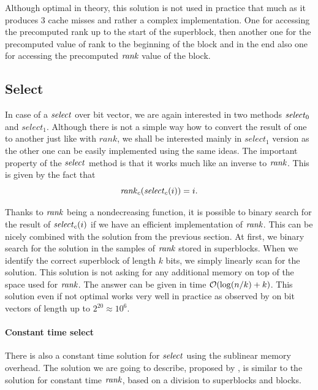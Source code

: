 Although optimal in theory, this solution is not used in practice that much as it produces
3 cache misses and rather a complex implementation. One for accessing the precomputed rank up
to the start of the superblock, then another one for the precomputed value of rank to the
beginning of the block and in the end also one for accessing the precomputed $\mathit{rank}$ value
of the block.


\subsection{Select}
\label{section:select}

In case of a $\mathit{select}$ over bit vector, we are again interested in two methods $\mathit{select}_0$
and $select_1$. Although there is not a simple way how to convert the result of one to
another just like with $rank$, we shall be interested mainly in $select_1$ version as the
other one can be easily implemented using the same ideas. The important property of the
$\mathit{select}$ method is that it works much like an inverse to $\mathit{rank}$. This is given by the fact that
$$\mathit{rank}_c(\mathit{select}_c(i)) = i.$$

Thanks to $\mathit{rank}$ being a nondecreasing function, it is possible
to binary search for the result of $\mathit{select}_c(i)$ if we have an efficient implementation of
$\mathit{rank}$. This can be nicely combined with the solution from the previous section.
At first, we binary search for the solution in the samples of $\mathit{rank}$ stored in superblocks. When we
identify the correct superblock of length $k$ bits, we simply linearly scan for the solution. This
solution is not asking for any additional memory on top of the space used for $\mathit{rank}$. The answer
can be given in time $\mathcal{O}(\log(n/k)+k)$. This solution even if not optimal works very well in
practice as observed by \cite{gonzalez2005practical} on bit vectors of length up to $2^20\approx 10^6$.

\paragraph{Constant time select}

There is also a constant time solution for $\mathit{select}$ using the sublinear memory overhead.
The solution we are going to describe, proposed by \cite{clark1997compact}, is similar to
the solution for constant time $\mathit{rank}$, based on a division to superblocks and blocks.


